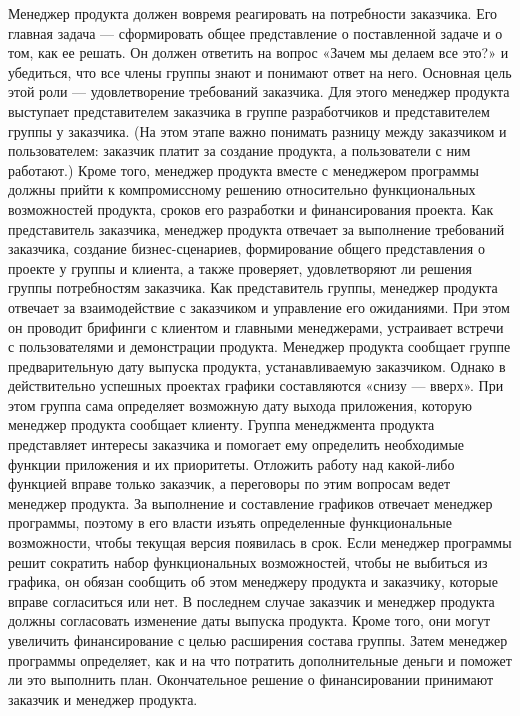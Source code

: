 \documentclass{../industrial-development}
\begin{document}
Менеджер продукта должен вовремя реагировать на потребности заказчика. Его главная задача — сформировать общее представление о поставленной задаче и о том, как ее решать. Он должен ответить на вопрос «Зачем мы делаем все это?» и убедиться, что все члены группы знают и понимают ответ на него.
Основная цель этой роли — удовлетворение требований заказчика. Для этого менеджер продукта выступает представителем заказчика в группе разработчиков и представителем группы у заказчика. (На этом этапе важно понимать разницу между заказчиком и пользователем: заказчик платит за создание продукта, а пользователи с ним работают.) Кроме того, менеджер продукта вместе с менеджером про­граммы должны прийти к компромиссному решению относительно функциональных возможностей продукта, сроков его разработки и финансирования проекта.
Как представитель заказчика, менеджер продукта отвечает за выполнение требований заказчика, создание бизнес-сценариев, формирование общего представления о проекте у группы и клиента, а также проверяет, удовлетворяют ли решения группы потребностям заказчика.
Как представитель группы, менеджер продукта отвечает за взаимодействие с заказчиком и управление его ожиданиями. При этом он проводит брифинги с клиентом и главными менеджерами, устраивает встречи с пользователями и демонстрации продукта.
Менеджер продукта сообщает группе предварительную дату выпуска продукта, устанавливаемую заказчиком. Однако в действительно успешных проектах графики составляются «снизу — вверх». При этом группа сама определяет возможную дату выхода приложения, которую менеджер продукта сообщает клиенту.
Группа менеджмента продукта представляет интересы заказчика и помогает ему определить необходимые функции приложения и их приоритеты. Отложить работу над какой-либо функцией вправе только заказчик, а переговоры по этим вопросам ведет менеджер продукта. За выполнение и составление графиков отвечает менеджер программы, поэтому в его власти изъять определенные функциональные возможности, чтобы текущая версия появилась в срок. Если менеджер программы решит сократить набор функциональных возможностей, чтобы не выбиться из графика,
он обязан сообщить об этом менеджеру продукта и заказчику, которые вправе согласиться или нет. В последнем случае заказчик и менеджер продукта должны согласовать изменение даты выпуска продукта. Кроме того, они могут увеличить финансирование с целью расширения состава группы. Затем менеджер программы определяет, как и на что потратить дополнительные деньги и поможет ли это выполнить план. Окончательное решение о финансировании принимают заказчик и менеджер продукта.
  ~\cite{Collective}
\end{document}
